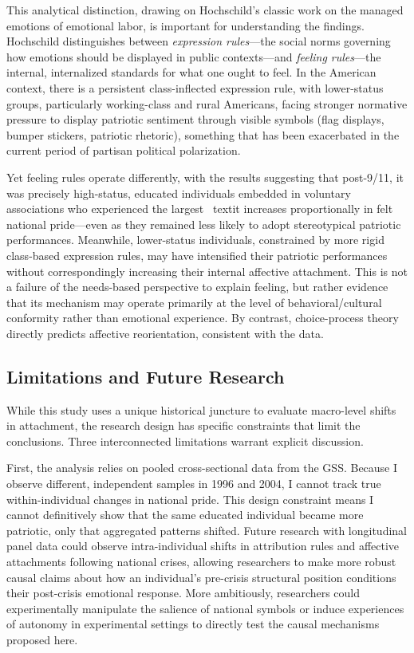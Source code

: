 \documentclass[12pt,letterpaper]{article}
\begin{document}
This analytical distinction, drawing on Hochschild's \citeyearpar{hochschild1979emotion-624} classic work on the managed emotions of emotional labor, is important for understanding the findings. Hochschild distinguishes between \textit{expression rules}---the social norms governing how emotions should be displayed in public contexts---and \textit{feeling rules}---the internal, internalized standards for what one ought to feel. In the American context, there is a persistent class-inflected expression rule, with lower-status groups, particularly working-class and rural Americans, facing stronger normative pressure to display patriotic sentiment through visible symbols (flag displays, bumper stickers, patriotic rhetoric), something that has been exacerbated in the current period of partisan political polarization. 

Yet feeling rules operate differently, with the results suggesting that post-9/11, it was precisely high-status, educated individuals embedded in voluntary associations who experienced the largest \ textit {increases} proportionally in felt national pride---even as they remained less likely to adopt stereotypical patriotic performances. Meanwhile, lower-status individuals, constrained by more rigid class-based expression rules, may have intensified their patriotic performances without correspondingly increasing their internal affective attachment. This is not a failure of the needs-based perspective to explain feeling, but rather evidence that its mechanism may operate primarily at the level of behavioral/cultural conformity rather than emotional experience. By contrast, choice-process theory directly predicts affective reorientation, consistent with the data.

\subsection{Limitations and Future Research}

While this study uses a unique historical juncture to evaluate macro-level shifts in attachment, the research design has specific constraints that limit the conclusions. Three interconnected limitations warrant explicit discussion.

First, the analysis relies on pooled cross-sectional data from the GSS. Because I observe different, independent samples in 1996 and 2004, I cannot track true within-individual changes in national pride. This design constraint means I cannot definitively show that the same educated individual became more patriotic, only that aggregated patterns shifted. Future research with longitudinal panel data could observe intra-individual shifts in attribution rules and affective attachments following national crises, allowing researchers to make more robust causal claims about how an individual's pre-crisis structural position conditions their post-crisis emotional response. More ambitiously, researchers could experimentally manipulate the salience of national symbols or induce experiences of autonomy in experimental settings to directly test the causal mechanisms proposed here.
\end{document}
